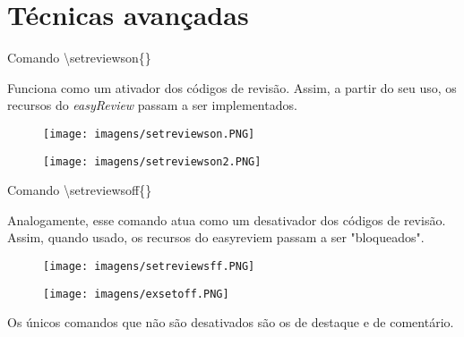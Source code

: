 \documentclass[aspectratio=169,smaller]{beamer}
\begin{document}
\section{Técnicas avançadas}

\begin{frame}{Comando \textbackslash setreviewson\{\}}
\justifying

Funciona como um ativador dos códigos de revisão. Assim, a partir do seu uso, os recursos do \textit{easyReview} passam a ser implementados.

\begin{center}
\begin{minipage}[ht]{0.45\textwidth}
\begin{figure}
        \centering
        \texttt{[image: imagens/setreviewson.PNG]}
    \end{figure}
\end{minipage}
\hspace{10pt}
\begin{minipage}[ht]{0.45\textwidth}
\begin{figure}
        \centering
        \texttt{[image: imagens/setreviewson2.PNG]}
    \end{figure}
\end{minipage}
\end{center}

\end{frame}

\begin{frame}{Comando \textbackslash setreviewsoff\{\}}
\justifying

Analogamente, esse comando atua como um desativador dos códigos de revisão. Assim, quando usado, os recursos do easyreviem passam a ser "bloqueados".

\begin{center}
\begin{minipage}[ht]{0.45\textwidth}
\begin{figure}
        \centering
        \texttt{[image: imagens/setreviewsff.PNG]}
    \end{figure}
\end{minipage}
\hspace{10pt}
\begin{minipage}[ht]{0.45\textwidth}
\begin{figure}
        \centering
        \texttt{[image: imagens/exsetoff.PNG]}
    \end{figure}
\end{minipage}
\end{center}

Os únicos comandos que não são desativados são os de destaque e de comentário.

\end{frame}
\end{document}
